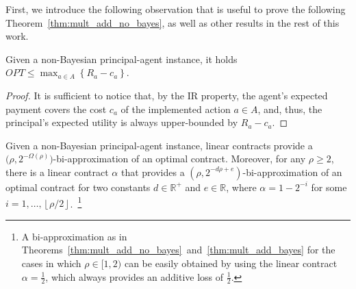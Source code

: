 First, we introduce the following observation that is useful to prove the following Theorem~\ref{thm:mult_add_no_bayes}, as well as other results in the rest of this work.
%

\begin{observation}\label{obs:opt_bound}
	Given a non-Bayesian principal-agent instance, it holds $OPT \leq \max_{a \in A} \left\{  R_a - c_a \right\}$.
\end{observation}
\begin{proof}
	It is sufficient to notice that, by the IR property, the agent's expected payment covers the cost $c_a$ of the implemented action $a\in A$, and, thus, the principal's expected utility is always upper-bounded by $R_a - c_a$.
\end{proof}


\begin{theorem}\label{thm:mult_add_no_bayes}
	Given a non-Bayesian principal-agent instance, linear contracts provide a $\big( \rho, 2^{-\Omega \left( \rho \right)} \big)$-bi-approximation of an optimal contract.
	Moreover, for any $\rho \geq 2$, there is a linear contract $\alpha$ that provides a $\left( \rho, 2^{- d \rho + e } \right)$-bi-approximation of an optimal contract for two constants $d \in \mathbb{R}^+$ and $e \in \mathbb{R}$, where $\alpha = 1 - 2^{-i}$ for some $i = 1, \ldots, \left\lfloor \rho /2 \right\rfloor$.~\footnote{A bi-approximation as in Theorems~\ref{thm:mult_add_no_bayes}~and~\ref{thm:mult_add_bayes} for the cases in which $\rho \in [1,2)$ can be easily obtained by using the linear contract $\alpha=\frac{1}{2}$, which always provides an additive loss of $\frac{1}{2}$.}
\end{theorem}

